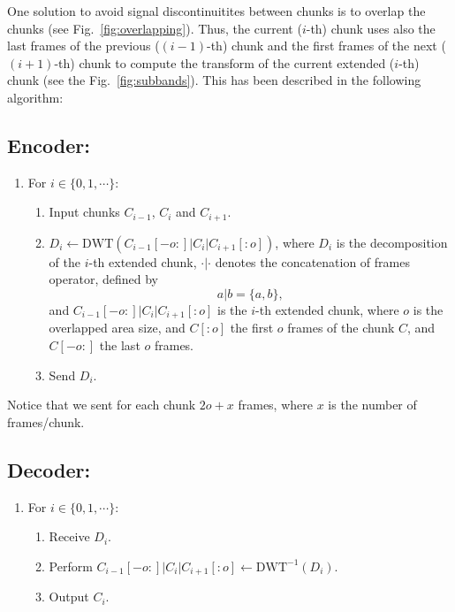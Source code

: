 One solution to avoid signal discontinuitites between chunks is to
overlap the chunks (see Fig.~\ref{fig:overlapping}). Thus, the current
($i$-th) chunk uses also the last frames of the previous ($(i-1)$-th)
chunk and the first frames of the next ($(i+1)$-th) chunk to compute
the transform of the current extended ($i$-th) chunk (see the
Fig.~\ref{fig:subbands}). This has been described in the following
algorithm:

\subsection*{Encoder:}
\begin{enumerate}
\item For $i\in\{0,1,\cdots\}$:   
  \begin{enumerate}               
  \item Input chunks $C_{i-1}$, $C_i$ and $C_{i+1}$.
  \item $D_i \leftarrow \text{DWT}(C_{i-1}[-o:]|C_i|C_{i+1}[:o])$,
    where $D_i$ is the decomposition of the $i$-th extended chunk,
    $\cdot|\cdot$ denotes the concatenation of frames operator,
    defined by
    \begin{equation}
      a|b = \{a,b\},
    \end{equation}
    and $C_{i-1}[-o:]|C_i|C_{i+1}[:o]$ is the $i$-th extended chunk,
    where $o$ is the overlapped area size, and $C[:o]$ the first $o$
    frames of the chunk $C$, and $C[-o:]$ the last $o$ frames.
  \item Send $D_i$.
  \end{enumerate}
\end{enumerate}

Notice that we sent for each chunk $2o+x$ frames, where $x$ is the
number of frames/chunk.

\subsection*{Decoder:}
\begin{enumerate}
\item For $i\in\{0,1,\cdots\}$:
  \begin{enumerate}
  \item Receive $D_i$.
  \item Perform $C_{i-1}[-o:]|C_i|C_{i+1}[:o]\leftarrow\text{DWT}^{-1}(D_i)$.
  \item Output $C_i$.
  \end{enumerate}
\end{enumerate}

